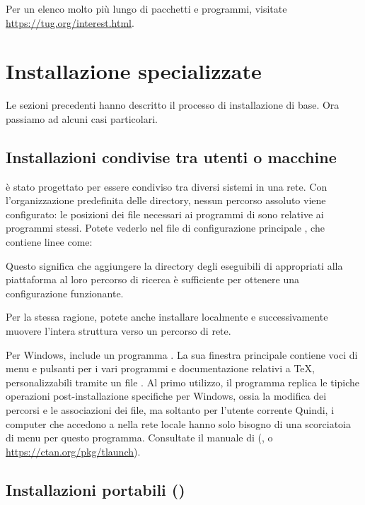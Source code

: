 \documentclass{article}
\begin{document}
Per un elenco molto più lungo di pacchetti e programmi, visitate
\url{https://tug.org/interest.html}.


\section{Installazione specializzate}

Le sezioni precedenti hanno descritto il processo di installazione di base.
Ora passiamo ad alcuni casi particolari.

\subsection{Installazioni condivise tra utenti o macchine}
\label{sec:sharedinstall}

\TL{} è stato progettato per essere condiviso tra diversi sistemi in una
rete. Con l'organizzazione predefinita delle directory, nessun percorso
assoluto viene configurato: le posizioni dei file necessari ai programmi di
\TL{} sono relative ai programmi stessi. Potete vederlo nel file di
configurazione principale , che
contiene linee come:
Questo significa che aggiungere la directory degli eseguibili di \TL{}
appropriati alla piattaforma al loro percorso di ricerca è sufficiente
per ottenere una configurazione funzionante.

Per la stessa ragione, potete anche installare \TL{} localmente e
successivamente muovere l'intera struttura verso un percorso di rete.

Per Windows, \TL{} include un programma . La sua finestra
principale contiene voci di menu e pulsanti per i vari programmi e
documentazione relativi a \TeX, personalizzabili tramite un file
. Al primo utilizzo, il programma replica le tipiche operazioni
post-installazione specifiche per Windows, ossia la modifica dei percorsi
e le associazioni dei file, ma soltanto per l'utente corrente Quindi,
i computer che accedono a \TL{} nella rete locale hanno solo bisogno di una
scorciatoia di menu per questo programma. Consultate il manuale di
 (, o \url{https://ctan.org/pkg/tlaunch}).


\subsection{Installazioni portabili (\USB)} 
\label{sec:portable-tl}
\end{document}
